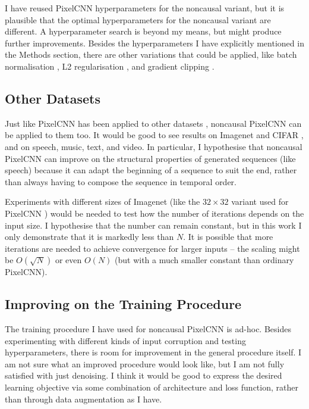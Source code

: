 \documentclass[10pt,a4paper]{article}
\begin{document}
I have reused PixelCNN hyperparameters for the noncausal variant, but it is plausible that the optimal hyperparameters for the noncausal variant are different. A hyperparameter search is beyond my means, but might produce further improvements. Besides the hyperparameters I have explicitly mentioned in the Methods section, there are other variations that could be applied, like batch normalisation \cite{??}, L2 regularisation \cite{??}, and gradient clipping \cite{??}.

\subsection{Other Datasets}

Just like PixelCNN has been applied to other datasets \cite{??}\cite{??}\cite{??}, noncausal PixelCNN can be applied to them too. It would be good to see results on Imagenet \cite{??} and CIFAR \cite{??}, and on speech, music, text, and video. In particular, I hypothesise that noncausal PixelCNN can improve on the structural properties of generated sequences (like speech) because it can adapt the beginning of a sequence to suit the end, rather than always having to compose the sequence in temporal order.

Experiments with different sizes of Imagenet (like the $32\times 32$ variant used for PixelCNN \cite{??}) would be needed to test how the number of iterations depends on the input size. I hypothesise that the number can remain constant, but in this work I only demonstrate that it is markedly less than $N$. It is possible that more iterations are needed to achieve convergence for larger inputs -- the scaling might be $O(\sqrt{N})$ or even $O(N)$ (but with a much smaller constant than ordinary PixelCNN).

\subsection{Improving on the Training Procedure}

The training procedure I have used for noncausal PixelCNN is ad-hoc. Besides experimenting with different kinds of input corruption and testing hyperparameters, there is room for improvement in the general procedure itself. I am not sure what an improved procedure would look like, but I am not fully satisfied with just denoising. I think it would be good to express the desired learning objective via some combination of architecture and loss function, rather than through data augmentation as I have.
\end{document}
